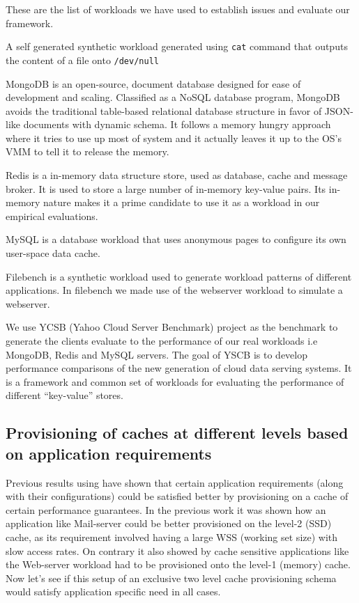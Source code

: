 	These are the list of workloads we have used to establish issues and evaluate our framework.
	  
	    A self generated synthetic workload generated using \texttt{cat} command that outputs the 
	    content of a file onto \texttt{/dev/null}
	  
	    MongoDB \cite{Mongodb} is an open-source, document database designed for ease of development and scaling. Classified as a NoSQL 
    database program, MongoDB avoids the traditional table-based relational database structure in favor of JSON-like documents with dynamic 
    schema. It follows a memory hungry approach where it tries to use up most of system and it actually leaves it up to the OS's VMM to tell it 
    to release the memory.

	    Redis \cite{Redis} is a in-memory data structure store, used as database, cache and message broker. It is used to store a large 
    number of in-memory key-value pairs. Its in-memory nature makes it a prime candidate to use it as a workload in our empirical evaluations.
      
	    MySQL \cite{mysql} is a database workload that uses anonymous pages to configure its own user-space data cache. 
	    
	    Filebench \cite{filebench} is a synthetic workload used to generate workload patterns of different applications. In filebench we made
	    use of the webserver workload to simulate a webserver.
	  
      
	    We use YCSB \cite{cooper2010benchmarking} (Yahoo Cloud Server Benchmark) project as the benchmark to generate the clients evaluate 
    to the performance of our real workloads i.e MongoDB, Redis and MySQL servers. The goal of YSCB is to develop performance comparisons of the new 
    generation of cloud data serving systems. It is a framework and common set of workloads for evaluating the performance of different 
    “key-value” stores.
  
    \subsection{Provisioning of caches at different levels based on application requirements}
    
      Previous results using \dd{}\cite{doubledecker} have shown that certain application requirements 
      (along with their configurations) could be satisfied better by provisioning on a cache of certain 
      performance guarantees. In the previous work\cite{doubledecker} it was shown how an application like 
      Mail-server could be better provisioned on the level-2 (SSD) cache, as its requirement involved 
      having a large WSS (working set size) with slow access rates. On contrary it also showed by cache sensitive 
      applications like the Web-server workload had to be provisioned onto the level-1 (memory) cache. 
      Now let's see if this setup of an exclusive two level cache provisioning schema would satisfy application
      specific need in all cases.
	
